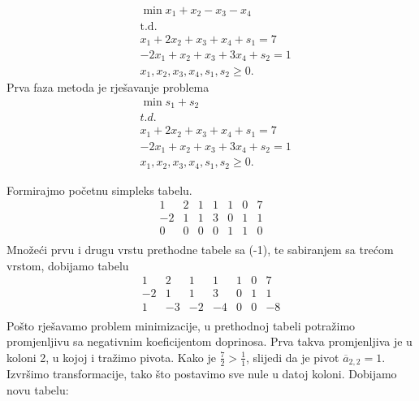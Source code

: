 \documentclass[a4paper, utf8, 11pt, colorlinks]{book}
\theoremstyle{definition}
\begin{document}
\begin{align*}
	&\min x_1 + x_2 - x_3 - x_4 \\
	&\mbox{t.d.} \\
	&x_1 + 2x_2 + x_3 + x_4 + s_1 = 7 \\
	& -2x_1 + x_2 + x_3 + 3x_4 + s_2 =  1 \\
	& x_1,x_2,x_3,x_4, s_1, s_2\geq 0.
\end{align*}
Prva faza metoda je rješavanje problema 
\begin{align*}
	&\min s_1 + s_2 \\
		&  {t.d.}\\
		& x_1 + 2x_2 + x_3 + x_4 + s_1 = 7 \\
	& -2x_1 + x_2 + x_3 + 3x_4 + s_2 = 1 \\
	& x_1,x_2,x_3,x_4, s_1, s_2\geq 0.
\end{align*}


Formirajmo početnu simpleks tabelu.
$$\begin{array}{cccccc|c}
	1 & 2 & 1 & 1 & 1 &  0 & 7  \\
   -2 & 1 & 1 & 3 & 0 &  1 & 1  \\ \hline
    0 & 0 & 0 & 0 & 1 & 1 &  0  \\
\end{array}
$$
Množeći prvu i drugu vrstu prethodne tabele sa (-1), te sabiranjem sa trećom vrstom, dobijamo tabelu
$$\begin{array}{cccccc|c}
	1 & 2 & 1 & 1 & 1 & 0 & 7 \\
	-2&1  & 1 & 3 & 0 & 1 & 1 \\ \hline
	1 & -3 & -2 & -4 & 0 & 0 & -8 \\ 
\end{array}
 $$
 Pošto rješavamo problem minimizacije, u prethodnoj tabeli potražimo promjenljivu 
 sa negativnim koeficijentom doprinosa. Prva takva promjenljiva je u koloni 2, u kojoj 
 i tražimo pivota.  Kako je $\frac{7}{2} > \frac{1}{1}$, slijedi da je 
 pivot $\overline{a}_{2,2} = 1$. Izvršimo transformacije, tako što postavimo sve nule u datoj koloni. Dobijamo novu tabelu:
 
\end{document}
